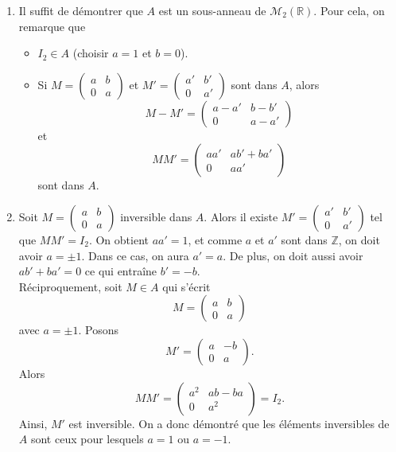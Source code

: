\documentclass[11pt,a4paper]{article}
\begin{document}
	\begin{corrige}
		\begin{enumerate}
			
			\item  Il suffit de démontrer que $A$ est un sous-anneau de $\mathcal M_2(\mathbb R).$ Pour cela, on remarque que
			
			\begin{itemize}
				
				\item  $I_2\in A$ (choisir $a=1$ et $b=0$).
				
				\item  Si $M=\begin{pmatrix}a&b\\0&a\end{pmatrix}$ et $M'=\begin{pmatrix}a'&b'\\0&a'\end{pmatrix}$ sont dans $A$, alors 
				$$M-M'=\begin{pmatrix}a-a'&b-b'\\0&a-a'\end{pmatrix}$$
				et 
				$$MM'=\begin{pmatrix}aa'&ab'+ba'\\0&aa'\end{pmatrix}$$
				sont dans $A.$
				
			\end{itemize}
			
			
			\item  Soit $M=\begin{pmatrix}a&b\\0&a\end{pmatrix}$ inversible dans $A$. Alors il existe $M'=\begin{pmatrix}a'&b'\\0&a'\end{pmatrix}$ tel que $MM'=I_2$. On obtient $aa'=1$, et comme $a$ et $a'$ sont dans $\mathbb Z$, on doit avoir $a=\pm 1$. Dans ce cas, on aura $a'=a$. De plus, on doit aussi avoir 
			$ab'+ba'=0$ ce qui entraîne $b'=-b$.\\
			
			Réciproquement, soit $M\in A$ qui s'écrit
			$$M=\begin{pmatrix}a&b\\0&a\end{pmatrix}$$
			avec $a=\pm 1$.
			Posons 
			$$M'=\begin{pmatrix}a&-b\\0&a\end{pmatrix}.$$
			Alors 
			$$MM'=\begin{pmatrix}a^2&ab-ba\\0&a^2\end{pmatrix}=I_2.$$
			Ainsi, $M'$ est inversible. On a donc démontré que les éléments inversibles de $A$ sont ceux pour lesquels $a=1$ ou $a=-1.$
			
		\end{enumerate}
	\end{corrige}
	
\end{document}
